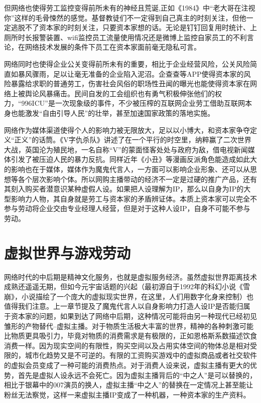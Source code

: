 \documentclass{ctexart}
\begin{document}
但网络也使得劳工监控变得前所未有的神经且荒诞,正如《1984》中“老大哥在注视你”这样的毛骨悚然的感觉。基督教徒们不一定得到自己真主的时刻关注，但他一定逃脱不了资本家的时刻关注，只要资本家想的话。无论是钉钉回复用时统计、上厕所时长报警装置、wifi监控员工流量使用情况还是微博上监控自家员工的不利言论，在网络技术发展的条件下员工在资本家面前毫无隐私可言。

网络同时也使得企业公关变得前所未有的重要，相比于企业经营风险，公关风险简直如暴风骤雨，足以让毫无准备的企业陷入泥沼。企查查等APP使得资本家的风险暴露给求职的普通劳工，伤害社会风俗的职场性丑闻的曝光也能使得资本家在网络上被舆论风暴痛击。民间自发的工会组织也有勇气积极伸张他们的权力，“996ICU”是一次现象级的事件，不少被压榨的互联网企业劳工借助互联网本身也能激发“自由引导人民”的壮举，甚至加速国家政策的落地实施。

网络作为媒体渠道使得个人的影响力被无限放大，足以以小博大，和资本家争夺定义“正义”的话筒。《V字仇杀队》讲述了在一个平行的时空里，纳粹赢了二次世界大战，英国沦为殖民地，一名自称“V”的蒙面怪客处处与政府为敌，借电视新闻媒体引发了被压迫人民的暴力反抗。同样近年《小丑》等漫画反派角色能造成如此大的影响也在于媒体，媒体作为魔鬼代言人，一方面可以影响企业形象、还可以从思想等各个层次影响个体。所以网购主播带动的经济不一定是过硬的推广产品，还有其刻入购买者潜意识某种虚假人设。如果把人设理解为IP，那么以自身为IP的大型影响力人物，其自身就是劳工与资本家的矛盾辨证体。本质上资本家可以完全不参与劳动将企业交由专业经理人经营，但是对于这种人设IP，自身不可能不参与劳动。

\section{虚拟世界与游戏劳动}

网络时代的中后期是精神文化服务，也就是虚拟服务经济。虽然虚拟世界距离技术成熟还遥遥无期，但如今元宇宙话题的兴起（最初源自于1992年的科幻小说《雪崩》，小说描绘了一个庞大的虚拟现实世界，在这里，人们用数字化身来控制）也值得我们注意。上一章节提及了魔鬼代言人以自身影响力打造人设IP是否能归属于资本家的问题，如果到达了网络中后期，这种情况可能将由另一种现代已经初见雏形的产物替代--虚拟主播。对于物质生活极大丰富的世界，精神的各种刺激可能比物质更具吸引力，毕竟对物质的消费需求是有极限的，正如恩格斯系数描述饮食消费一样。因为现实空间的有限性，购买空间以及占用实体空间的物体总是相对受限的，城市化趋势又是不可逆的。有限的工资购买游戏中的虚拟商品或者社交软件的虚拟会员变成了一种可能的消费热点。对于消费人设来说，虚拟主播有更大的优势，首先是虚拟人设永远不会死亡。因为虚拟主播背后的“中之人”是可以替换的，相比于银幕中的007演员的换人，虚拟主播“中之人”的替换在一定情况上甚至能让粉丝无法察觉，这样一来虚拟主播IP变成了一种机器，一种资本家的生产资料。
\end{document}
